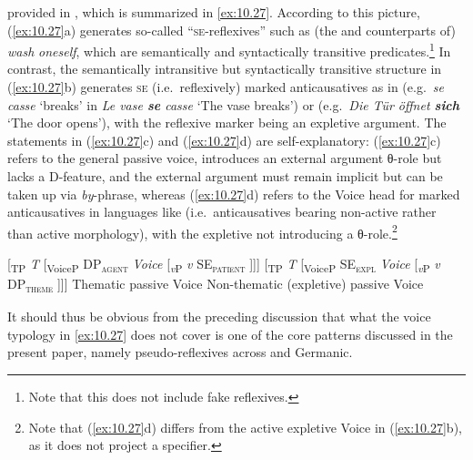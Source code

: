 \documentclass[output=paper]{langsci/langscibook}
\begin{document}
provided in \citet{Schäfer2008}, which is summarized in \eqref{ex:10.27}.
According to this picture, (\ref{ex:10.27}a) generates so-called
“\textsc{se}-reflexives” such as (the  and  counterparts of)
\emph{wash} \emph{oneself}, which are semantically and syntactically transitive
predicates.\footnote{Note that this does not include fake reflexives.} In
contrast, the semantically intransitive but syntactically transitive structure
in (\ref{ex:10.27}b) generates \textsc{se} (i.e.\ reflexively) marked
anticausatives as in  (e.g.\ \emph{se casse} ‘breaks’ in \emph{Le vase
\textbf{se} casse} ‘The vase breaks’) or  (e.g.\ \emph{Die Tür öffnet
\textbf{sich}} ‘The door opens’), with the reflexive marker being an expletive
argument. The statements in (\ref{ex:10.27}c) and (\ref{ex:10.27}d) are
self-explanatory: (\ref{ex:10.27}c) refers to the general passive voice,
introduces an external argument θ-role but lacks a D-feature, and the external
argument must remain implicit but can be taken up via \emph{by}{}-phrase,
whereas (\ref{ex:10.27}d) refers to the Voice head for marked
anticausatives in languages like  (i.e.\ anticausatives bearing non-active
rather than active morphology), with the expletive not introducing a
θ-role.\footnote{Note that (\ref{ex:10.27}d) differs from the active
expletive Voice in (\ref{ex:10.27}b), as it does not project a specifier.}

\ea\label{ex:10.27}
    \ea   {}[\textsubscript{TP} \emph{T} [\textsubscript{VoiceP} DP\textsubscript{\textsc{agent}} \emph{Voice} [\textsubscript{\emph{v}P} \emph{v} SE\textsubscript{\textsc{patient}} ]]]
    \ex   {}[\textsubscript{TP} \emph{T} [\textsubscript{VoiceP} SE\textsubscript{\textsc{expl}} \emph{Voice} [\textsubscript{\emph{v}P} \emph{v} DP\textsubscript{\textsc{theme}} ]]]
    \ex   Thematic passive Voice
    \ex   Non-thematic (expletive) passive Voice
    \z
\z

It should thus be obvious from the preceding discussion that what the voice
typology in \eqref{ex:10.27} does not cover is one of the core patterns
discussed in the present paper, namely pseudo-reflexives across  and
Germanic.
\end{document}
